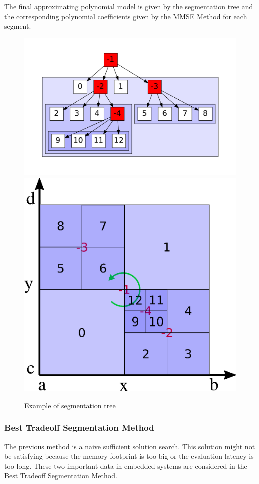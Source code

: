 \documentclass[fleqn,10pt]{SelfArx} %
\begin{document}
The final approximating polynomial model is given by the segmentation tree and the corresponding polynomial coefficients given by the MMSE Method for each segment.
\begin{figure}
\centering
\includegraphics[width=\columnwidth]{graphics/seg_tree.pdf}
\includegraphics[width=0.7\columnwidth]{graphics/segmentation.eps}
\caption{Example of segmentation tree}
\label{seg_tree}
\end{figure}

\subsubsection{Best Tradeoff Segmentation Method}
The previous method is a naive sufficient solution search. This solution might not be satisfying because the memory footprint is too big or the evaluation latency is too long. These two important data in embedded systems are considered in the Best Tradeoff Segmentation Method. 
\end{document}
